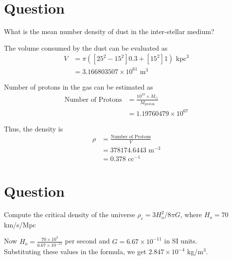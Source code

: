 \documentclass[paper=a4, fontsize=11pt]{scrartcl} %
\numberwithin{equation}{section} %
\numberwithin{figure}{section} %
\numberwithin{table}{section} %
\begin{document}
\section{Question}
	What is the mean number density of dust in the inter-stellar medium?
	\par
	The volume consumed by the dust can be evaluated as
	\begin{equation}	
	\begin{split}
		V&=\pi ([25^2 - 15^2]0.3 + [15^2]1) \text{ kpc}^3\\
		&=3.166803507\times10^{61} \text{ m}^3
	\end{split}
	\end{equation}

	Number of protons in the gas can be estimated as
	\begin{equation}	
	\begin{split}
		\text{Number of Protons} &=\frac{10^{10}\times M_\odot}{M_\text{proton}} \\
		&=1.19760479\times10^{67}
	\end{split}
	\end{equation}

	Thus, the density is
	\begin{equation}
	\begin{split}
		\rho&=\frac{\text{Number of Protons}}{V}\\
		&=378174.6443 \text{ m}^{-3}\\
		&=0.378 \text{ cc}^{-1}
	\end{split}
	\end{equation}

\section{Question}
	Compute the critical density of the universe $\rho_c=3H_o^2/8\pi G$, where $H_o=70$ km/s/Mpc\\
	\par
	Now $H_o=\frac{70 \times 10^3}{6.67\times10^{-11}}$ per second and $G=6.67\times 10^{-11}$ in SI units.\\
	Substituting these values in the formula, we get $2.847\times10^{-4}$ kg/m$^3$.
\end{document}
